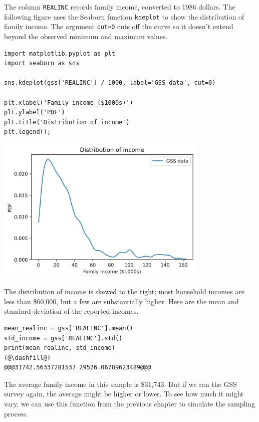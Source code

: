 The column \passthrough{\lstinline!REALINC!} records family income,
converted to 1986 dollars. The following figure uses the Seaborn
function \passthrough{\lstinline!kdeplot!} to show the distribution of
family income. The argument \passthrough{\lstinline!cut=0!} cuts off the
curve so it doesn't extend beyond the observed minimum and maximum
values.

\begin{lstlisting}[]
import matplotlib.pyplot as plt
import seaborn as sns

sns.kdeplot(gss['REALINC'] / 1000, label='GSS data', cut=0)

plt.xlabel('Family income ($1000s)')
plt.ylabel('PDF')
plt.title('Distribution of income')
plt.legend();
\end{lstlisting}

\begin{center}
\includegraphics[width=4in]{chapters/12_bootstrap_files/12_bootstrap_10_0.png}
\end{center}

The distribution of income is skewed to the right; most household
incomes are less than \$60,000, but a few are substantially higher. Here
are the mean and standard deviation of the reported incomes.

\begin{lstlisting}[]
mean_realinc = gss['REALINC'].mean()
std_income = gss['REALINC'].std()
print(mean_realinc, std_income)
(@\dashfill@)
@@@31742.56337281537 29526.06789623489@@@
\end{lstlisting}

The average family income in this sample is \$31,743. But if we ran the
GSS survey again, the average might be higher or lower. To see how much
it might vary, we can use this function from the previous chapter to
simulate the sampling process.

